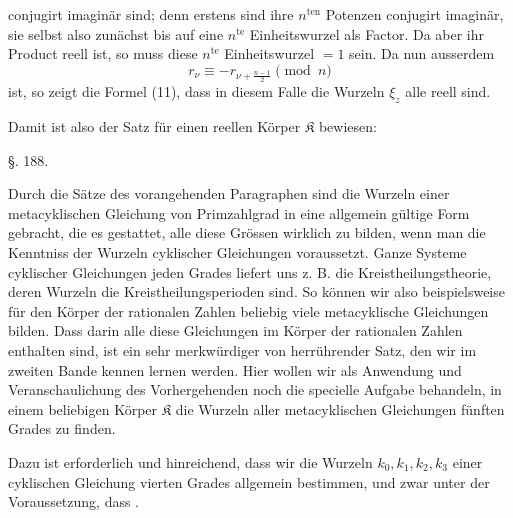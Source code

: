conjugirt imaginär sind; denn erstens sind ihre $n^{\mathrm{ten}}$ Potenzen conjugirt
imaginär, sie selbst also zunächst bis auf eine $n^{\mathrm{te}}$ Einheitswurzel als
Factor. Da aber ihr Product reell ist, so muss diese $n^{\mathrm{te}}$ Einheitswurzel
$= 1$ sein. Da nun ausserdem
\[
r_\nu \equiv - r_{\nu + \frac{n-1}{2}} \pmod{n}
\]
ist, so zeigt die Formel (11), dass in diesem Falle die Wurzeln $\xi_z$ alle reell sind.

Damit ist also der Satz für einen reellen Körper $\mathfrak{K}$ bewiesen:


\begin{center}
§. 188.

\end{center}

Durch die Sätze des vorangehenden Paragraphen sind die Wurzeln einer metacyklischen
Gleichung von Primzahlgrad in eine allgemein gültige Form gebracht, die es gestattet,
alle diese Grössen wirklich zu bilden, wenn man die Kenntniss der Wurzeln cyklischer
Gleichungen voraussetzt. Ganze Systeme cyklischer Gleichungen jeden Grades liefert uns
z. B. die Kreistheilungstheorie, deren Wurzeln die Kreistheilungsperioden sind. So
können wir also beispielsweise für den Körper der rationalen Zahlen beliebig viele
metacyklische Gleichungen bilden. Dass darin alle diese Gleichungen im Körper der
rationalen Zahlen enthalten sind, ist ein sehr merkwürdiger von 
herrührender Satz, den wir im zweiten Bande kennen lernen werden. Hier wollen wir als
Anwendung und Veranschaulichung des Vorhergehenden noch die specielle Aufgabe
behandeln, in einem beliebigen Körper $\mathfrak{K}$ die Wurzeln aller metacyklischen
Gleichungen fünften Grades zu finden.

Dazu ist erforderlich und hinreichend, dass wir die Wurzeln $k_0, k_1, k_2, k_3$ einer
cyklischen Gleichung vierten Grades allgemein bestimmen, und zwar unter der
Voraussetzung, dass .

